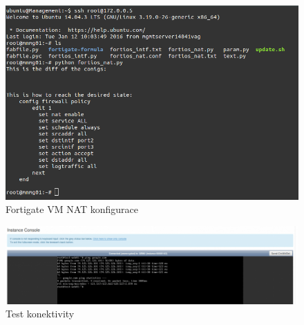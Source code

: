 \begin{figure}[h]
\begin{centering}
\includegraphics[scale=0.45]{images/fortigate_nat}
\par\end{centering}
\caption{Fortigate VM NAT konfigurace\label{fig:fortigate_nat}}
\end{figure}

\begin{figure}[h]
\begin{centering}
\includegraphics[scale=0.45]{images/fortigate_ping}
\par\end{centering}
\caption{Test konektivity\label{fig:fortigate_ping}}
\end{figure}

